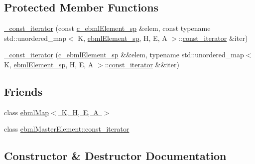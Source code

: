 \subsection*{Protected Member Functions}
\begin{DoxyCompactItemize}
\item 
\mbox{\hyperlink{classebml_1_1ebmlMap_1_1__const__iterator_a54489bbad9412f9adf099569a1f070d4}{\+\_\+const\+\_\+iterator}} (const \mbox{\hyperlink{namespaceebml_a2deef4e8071531b32e3533f1bf978917}{c\+\_\+ebml\+Element\+\_\+sp}} \&elem, const typename std\+::unordered\+\_\+map$<$ K, \mbox{\hyperlink{namespaceebml_adad533b7705a16bb360fe56380c5e7be}{ebml\+Element\+\_\+sp}}, H, E, A $>$\+::\mbox{\hyperlink{classebml_1_1ebmlMasterElement_1_1const__iterator}{const\+\_\+iterator}} \&iter)
\item 
\mbox{\hyperlink{classebml_1_1ebmlMap_1_1__const__iterator_a3e9d0048a1ec76406c6961f4d180bfbb}{\+\_\+const\+\_\+iterator}} (\mbox{\hyperlink{namespaceebml_a2deef4e8071531b32e3533f1bf978917}{c\+\_\+ebml\+Element\+\_\+sp}} \&\&elem, typename std\+::unordered\+\_\+map$<$ K, \mbox{\hyperlink{namespaceebml_adad533b7705a16bb360fe56380c5e7be}{ebml\+Element\+\_\+sp}}, H, E, A $>$\+::\mbox{\hyperlink{classebml_1_1ebmlMasterElement_1_1const__iterator}{const\+\_\+iterator}} \&\&iter)
\end{DoxyCompactItemize}
\subsection*{Friends}
\begin{DoxyCompactItemize}
\item 
class \mbox{\hyperlink{classebml_1_1ebmlMap_1_1__const__iterator_a691e480013452ea48661a61746fd1b5c}{ebml\+Map$<$ K, H, E, A $>$}}
\item 
class \mbox{\hyperlink{classebml_1_1ebmlMap_1_1__const__iterator_a734affd0f736e2e4e03ab2cf8a9f9b26}{ebml\+Master\+Element\+::const\+\_\+iterator}}
\end{DoxyCompactItemize}


\subsection{Constructor \& Destructor Documentation}
\mbox{\label{classebml_1_1ebmlMap_1_1__const__iterator_a54489bbad9412f9adf099569a1f070d4}} 
